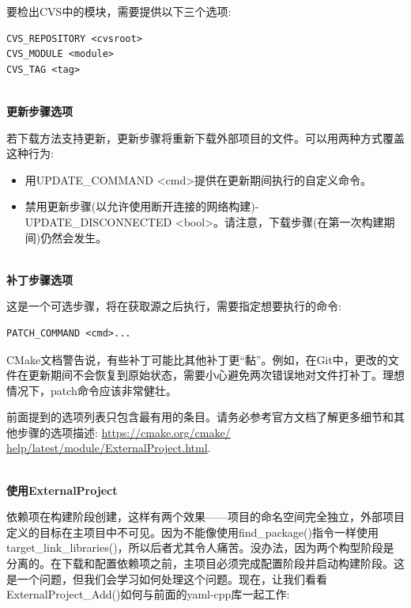 要检出CVS中的模块，需要提供以下三个选项:

\begin{lstlisting}[style=styleCMake]
CVS_REPOSITORY <cvsroot>
CVS_MODULE <module>
CVS_TAG <tag>
\end{lstlisting} 

\hspace*{\fill} \\ %
\noindent
\textbf{更新步骤选项}

若下载方法支持更新，更新步骤将重新下载外部项目的文件。可以用两种方式覆盖这种行为:

\begin{itemize}
\item 
用UPDATE\_COMMAND <cmd>提供在更新期间执行的自定义命令。

\item 
禁用更新步骤(以允许使用断开连接的网络构建)- UPDATE\_DISCONNECTED <bool>。请注意，下载步骤(在第一次构建期间)仍然会发生。
\end{itemize}

\hspace*{\fill} \\ %
\noindent
\textbf{补丁步骤选项}

这是一个可选步骤，将在获取源之后执行，需要指定想要执行的命令:

\begin{lstlisting}[style=styleCMake]
PATCH_COMMAND <cmd>...
\end{lstlisting} 

CMake文档警告说，有些补丁可能比其他补丁更“黏”。例如，在Git中，更改的文件在更新期间不会恢复到原始状态，需要小心避免两次错误地对文件打补丁。理想情况下，patch命令应该非常健壮。

\begin{tcolorbox}[colback=blue!5!white,colframe=blue!75!black,title=重要的Note]
前面提到的选项列表只包含最有用的条目。请务必参考官方文档了解更多细节和其他步骤的选项描述: \url{https://cmake.org/cmake/ help/latest/module/ExternalProject.html}.
\end{tcolorbox}

\hspace*{\fill} \\ %
\noindent
\textbf{使用ExternalProject}

依赖项在构建阶段创建，这样有两个效果——项目的命名空间完全独立，外部项目定义的目标在主项目中不可见。因为不能像使用find\_package()指令一样使用target\_link\_libraries()，所以后者尤其令人痛苦。没办法，因为两个构型阶段是分离的。在下载和配置依赖项之前，主项目必须完成配置阶段并启动构建阶段。这是一个问题，但我们会学习如何处理这个问题。现在，让我们看看ExternalProject\_Add()如何与前面的yaml-cpp库一起工作:

